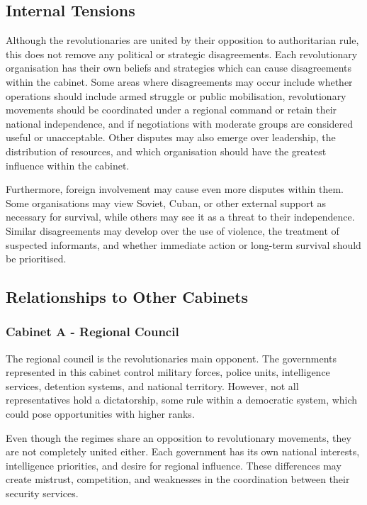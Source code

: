 \subsection{Internal Tensions}

Although the revolutionaries are united by their opposition to authoritarian rule, this does not remove any political or strategic disagreements. Each revolutionary organisation has their own beliefs and strategies which can cause disagreements within the cabinet. Some areas where disagreements may occur include whether operations should include armed struggle or public mobilisation, revolutionary movements should be coordinated under a regional command or retain their national independence, and if negotiations with moderate groups are considered useful or unacceptable. Other disputes may also emerge over leadership, the distribution of resources, and which organisation should have the greatest influence within the cabinet.

Furthermore, foreign involvement may cause even more disputes within them. Some organisations may view Soviet, Cuban, or other external support as necessary for survival, while others may see it as a threat to their independence. Similar disagreements may develop over the use of violence, the treatment of suspected informants, and whether immediate action or long-term survival should be prioritised.

\subsection{Relationships to Other Cabinets}

\subsubsection{Cabinet A - Regional Council}

The regional council is the revolutionaries main opponent. The governments represented in this cabinet control military forces, police units, intelligence services, detention systems, and national territory. However, not all representatives hold a dictatorship, some rule within a democratic system, which could pose opportunities with higher ranks.

Even though the regimes share an opposition to revolutionary movements, they are not completely united either. Each government has its own national interests, intelligence priorities, and desire for regional influence. These differences may create mistrust, competition, and weaknesses in the coordination between their security services.


